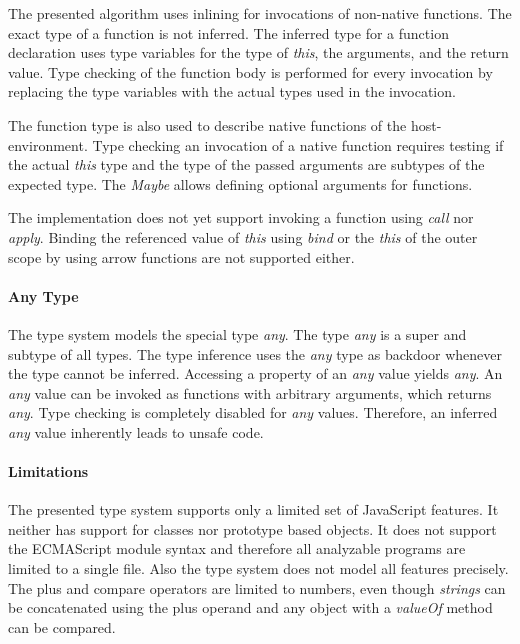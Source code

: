 The presented algorithm uses inlining for invocations of non-native functions. The exact type of a function is  not inferred. The inferred type for a function declaration uses type variables for the type of \textit{this}, the arguments, and the return value. Type checking of the function body is performed for every invocation by replacing the type variables with the actual types used in the invocation. 

The function type is also used to describe native functions of the host-environment. Type checking an invocation of a native function requires testing if the actual \textit{this} type and the type of the passed arguments are subtypes of the expected type. The \textit{Maybe} allows defining optional arguments for functions.

The implementation does not yet support invoking a function using \textit{call} nor \textit{apply}. Binding the referenced value of \textit{this} using \textit{bind} or the \textit{this} of the outer scope by using arrow functions are not supported either.

\paragraph{Any Type}
The type system models the special type \textit{any}. The type \textit{any} is a super and subtype of all types. The type inference uses the \textit{any} type as backdoor whenever the type cannot be inferred. Accessing a property of an \textit{any} value yields \textit{any}. An \textit{any} value can be invoked as functions with arbitrary arguments, which returns \textit{any}. Type checking is completely disabled for \textit{any} values. Therefore, an inferred \textit{any} value inherently leads to unsafe code.

\paragraph{Limitations}
The presented type system supports only a limited set of JavaScript features. It neither has support for classes nor prototype based objects. It does not support the ECMAScript module syntax and therefore all analyzable programs are limited to a single file. Also the type system does not model all features precisely. The plus and compare operators are limited to numbers, even though \textit{strings} can be concatenated using the plus operand and any object with a \textit{valueOf} method can be compared. 